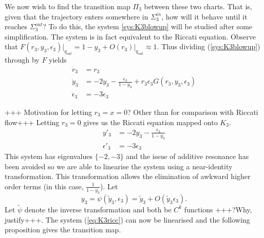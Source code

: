 We now wish to find the transition map $\Pi_3$ between these two charts. That is, given that the trajectory enters somewhere in $\Sigma_3^{in}$, how will it behave until it reaches $\Sigma_3^{out}$? To do this, the system \ref{sys:K3blowup} will be studied after some simplification. The system is in fact equivalent to the Riccati equation. Observe that $F(r_3,y_3,\epsilon_3)\big|_{q_{out}} = 1-y_3 + O(r_3)\big|_{q_{out}} \approx 1 $. Thus dividing (\ref{sys:K3blowup}) through by $F$ yields
\begin{subequations}
\begin{align}
\dot{r}_3&=r_3\\
\dot{y}_3&=-2y_3 - \frac{\epsilon_3}{1-y_3}+r_3\epsilon_3 G(r_3,y_3,\epsilon_3)\\
\dot{\epsilon}_3 &= -3\epsilon_3
\end{align}
\label{eq:K3ricc}
\end{subequations}

+++ Motivation for letting $r_3=x=0$? Other than for comparison with Riccati flow+++ Letting $r_3=0$ gives us the Riccati equation mapped onto $K_3$.
\begin{align*}
	y'_3 &= -2y_3-\frac{\epsilon_3}{1-y_3}\\
	\epsilon'_3 &= -3\epsilon_3
\end{align*}
This system has eigenvalues $\lbrace -2,-3\rbrace$ and the issue of additive resonance has been avoided so we are able to linearise the system using a near-identity transformation. This transformation allows the elimination of awkward higher order terms (in this case, $\frac{1}{1-y_3}$). Let
$$y_3=\psi(\tilde{y}_3,\epsilon_3)=\tilde{y}_3+O(\tilde{y}_3\epsilon_3).$$
Let $\tilde{\psi}$ denote the inverse transformation and both be $C^k$ functions +++?Why, justify+++. The system (\ref{eq:K3ricc}) can now be linearised and the following proposition gives the transition map.

